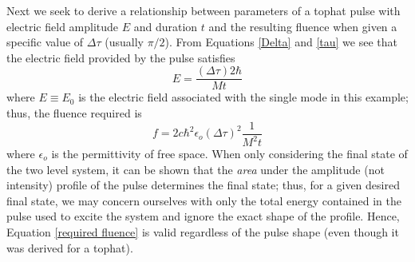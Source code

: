 Next we seek to derive a relationship between parameters of a tophat pulse with electric field amplitude $E$ and duration $t$ and the resulting fluence when given a specific value of $\Delta \tau$ (usually $\pi/2$). From Equations \ref{Delta} and \ref{tau} we see that the electric field provided by the pulse satisfies
\begin{equation}
E
=
\frac
{(\Delta\tau) 2 \hbar
}{
Mt}
\end{equation}
where $E\equiv E_0$ is the electric field associated with the single mode in this example; thus, the fluence required is
\begin{equation}
\boxed{
f
=
2 c \hbar^2\epsilon_o
(\Delta\tau)^2
\frac{1}{M^2 t}
\label{required fluence}
}
\end{equation}
where $\epsilon_o$ is the permittivity of free space. When only considering the final state of the two level system, it can be shown \cite{Allen:1987a} that the \emph{area} under the amplitude (not intensity) profile of the pulse determines the final state; thus, for a given desired final state, we may concern ourselves with only the total energy contained in the pulse used to excite the system and ignore the exact shape of the profile. Hence, Equation \ref{required fluence} is valid regardless of the pulse shape (even though it was derived for a tophat).
